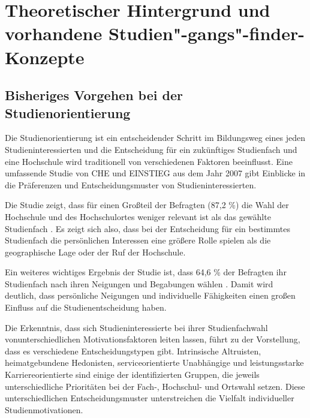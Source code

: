 \section{Theoretischer Hintergrund und vorhandene Studien"-gangs"-finder-Konzepte}
\subsection{Bisheriges Vorgehen bei der Studienorientierung}


Die Studienorientierung ist ein entscheidender Schritt im Bildungsweg eines
jeden Studieninteressierten und die Entscheidung für ein zukünftiges Studienfach
und eine Hochschule wird traditionell von verschiedenen Faktoren beeinflusst.
Eine umfassende Studie von CHE und EINSTIEG aus dem Jahr 2007 gibt Einblicke in
die Präferenzen und Entscheidungsmuster von Studieninteressierten.

Die Studie zeigt, dass für einen Großteil der Befragten (87,2 \%) die Wahl der Hochschule und des Hochschulortes weniger relevant ist als das gewählte Studienfach \parencite{hachmeister_einflussfaktoren_2023}. Es zeigt sich also, dass bei der Entscheidung für ein bestimmtes Studienfach die persönlichen Interessen eine größere Rolle spielen als die geographische Lage oder der Ruf der Hochschule.

Ein weiteres wichtiges Ergebnis der Studie ist, dass 64,6 \% der Befragten ihr Studienfach nach ihren Neigungen und Begabungen wählen \parencite{hachmeister_einflussfaktoren_2023}. Damit wird deutlich, dass persönliche Neigungen und individuelle Fähigkeiten einen großen Einfluss auf die Studienentscheidung haben.

Die Erkenntnis, dass sich Studieninteressierte bei ihrer Studienfachwahl vonunterschiedlichen Motivationsfaktoren leiten lassen, führt zu der Vorstellung, dass es verschiedene Entscheidungstypen gibt. Intrinsische Altruisten, heimatgebundene Hedonisten, serviceorientierte Unabhängige und leistungsstarke Karriereorientierte sind einige der identifizierten Gruppen, die jeweils unterschiedliche Prioritäten bei der Fach-, Hochschul- und Ortswahl setzen. Diese unterschiedlichen Entscheidungsmuster unterstreichen die Vielfalt individueller Studienmotivationen. \parencite{hachmeister_einflussfaktoren_2023}

